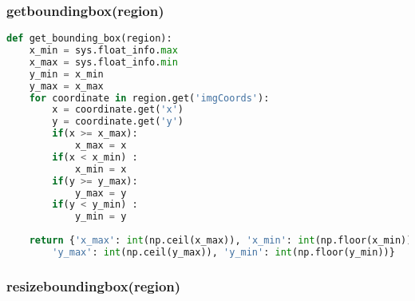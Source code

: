 \subsubsection{get{\textunderscore}bounding{\textunderscore}box(region)}

\begin{lstlisting}[frame=single,language=python]
def get_bounding_box(region):
	x_min = sys.float_info.max
	x_max = sys.float_info.min
	y_min = x_min
	y_max = x_max
	for coordinate in region.get('imgCoords'):
		x = coordinate.get('x')
		y = coordinate.get('y')
		if(x >= x_max):
			x_max = x
		if(x < x_min) :
			x_min = x
		if(y >= y_max):
			y_max = y
		if(y < y_min) :
			y_min = y
	
	return {'x_max': int(np.ceil(x_max)), 'x_min': int(np.floor(x_min)),
		'y_max': int(np.ceil(y_max)), 'y_min': int(np.floor(y_min))}
\end{lstlisting}


\subsubsection{resize{\textunderscore}bounding{\textunderscore}box(region)}


